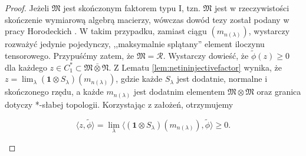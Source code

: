 \begin{proof}
Jeżeli $\mathfrak{M}$ jest skończonym faktorem typu I, tzn. $\mathfrak{M}$ jest
w rzeczywistości skończenie wymiarową algebrą macierzy,
wówczas dowód tezy został podany w pracy Horodeckich
\cite{horodecki1996separability}.
W takim przypadku, zamiast ciągu $(m_{n(\lambda)})$,
wystarczy rozważyć jedynie pojedynczy,
,,maksymalnie splątany'' element iloczynu tensorowego.
Przypuśćmy zatem, że $\mathfrak{M} = \mathcal{R}$.
Wystarczy dowieść, że
$\tilde{\phi}(z) \geq 0$ dla każdego
$z \in C_{1}^{*} \subset \mathfrak{M} \bar{\otimes} \mathfrak{N}$.
Z Lematu \ref{lem:netininjectivefactor} wynika, że
$z = \lim_{\lambda} (\mathbf{1} \otimes S_{\lambda})(m_{n(\lambda)})$,
gdzie każde $S_{\lambda}$
jest dodatnie, normalne i skończonego rzędu,
a każde $m_{n(\lambda)}$ jest dodatnim elementem $\mathfrak{M} \otimes \mathfrak{M}$
oraz granica dotyczy *-słabej topologii.
Korzystając z założeń, otrzymujemy
\begin{linenomath*}
 \begin{equation}
\langle z , \tilde{\phi} \rangle =\lim \limits_{\lambda}
\langle ( \mathbf{1} \otimes S_{\lambda}) (m_{n(\lambda)}), \tilde{\phi}
\rangle \geq 0.
 \end{equation}
\end{linenomath*}
\end{proof}

